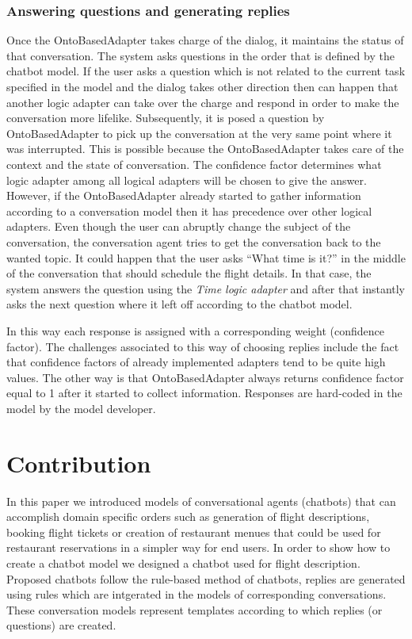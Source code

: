 \documentclass[runningheads]{llncs}
\begin{document}
\subsubsection{Answering questions and generating replies}
Once the OntoBasedAdapter takes charge of the dialog, it maintains the status of that conversation. The system asks questions in the order that is defined by the chatbot model. If the user asks a question which is not related to the current task specified in the model and the dialog takes other direction then can happen that another logic adapter can take over the charge and respond in order to make the conversation more lifelike. Subsequently, it is posed a question by OntoBasedAdapter to pick up the conversation at the very same point where it was interrupted. This is possible because the OntoBasedAdapter takes care of the context and the state of conversation.   
The confidence factor determines what logic adapter among all logical adapters will be chosen to give the answer. However, if the OntoBasedAdapter already started to gather information according to a conversation model then it has precedence over other logical adapters. Even though the user can abruptly change the subject of the conversation, the conversation agent tries to get the conversation back to the wanted topic. It could happen that the user asks ``What time is it?'' in the middle of the conversation that should schedule the flight details. In that case, the system answers the question using the \textit{Time logic adapter} and after that instantly asks the next question where it left off according to the chatbot model.

In this way each response is assigned with a corresponding weight (confidence factor). The challenges associated to this way of choosing replies include the fact that confidence factors of already implemented adapters tend to be quite high values. The other way is that OntoBasedAdapter always returns confidence factor equal to 1 after it started to collect information.  
Responses are hard-coded in the model by the model developer.




\section{Contribution}
In this paper we introduced models of conversational agents (chatbots) that can accomplish domain specific orders such as generation of flight descriptions, booking flight tickets or creation of restaurant menues that could be used for restaurant reservations in a simpler way for end users. 
In order to show how to create a chatbot model we designed a chatbot used for flight description.
Proposed chatbots follow the rule-based method of chatbots, replies are generated using rules which are intgerated in the models of corresponding conversations. These conversation models represent templates according to which replies (or questions) are created.   
\end{document}
